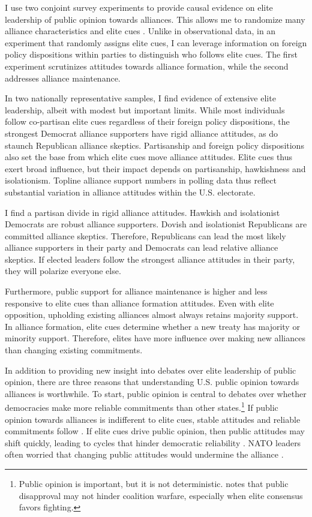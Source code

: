 \documentclass[12pt]{article}
\begin{document}
I use two conjoint survey experiments to provide causal evidence on elite leadership of public opinion towards alliances.
This allows me to randomize many alliance characteristics and elite cues \citep{Hainmuelleretal2014}.
Unlike in observational data, in an experiment that randomly assigns elite cues, I can leverage information on foreign policy dispositions within parties to distinguish who follows elite cues. 
The first experiment scrutinizes attitudes towards alliance formation, while the second addresses alliance maintenance. 


In two nationally representative samples, I find evidence of extensive elite leadership, albeit with modest but important limits.
While most individuals follow co-partisan elite cues regardless of their foreign policy dispositions, the strongest Democrat alliance supporters have rigid alliance attitudes, as do staunch Republican alliance skeptics. 
Partisanship and foreign policy dispositions also set the base from which elite cues move alliance attitudes.
Elite cues thus exert broad influence, but their impact depends on partisanship, hawkishness and isolationism.
Topline alliance support numbers in polling data thus reflect substantial variation in alliance attitudes within the U.S. electorate.


I find a partisan divide in rigid alliance attitudes.
Hawkish and isolationist Democrats are robust alliance supporters.
Dovish and isolationist Republicans are committed alliance skeptics. 
Therefore, Republicans can lead the most likely alliance supporters in their party and Democrats can lead relative alliance skeptics. 
If elected leaders follow the strongest alliance attitudes in their party, they will polarize everyone else. 


Furthermore, public support for alliance maintenance is higher and less responsive to elite cues than alliance formation attitudes.
Even with elite opposition, upholding existing alliances almost always retains majority support. 
In alliance formation, elite cues determine whether a new treaty has majority or minority support. 
Therefore, elites have more influence over making new alliances than changing existing commitments. 


In addition to providing new insight into debates over elite leadership of public opinion, there are three reasons that understanding U.S. public opinion towards alliances is worthwhile. 
To start, public opinion is central to debates over whether democracies make more reliable commitments than other states.\footnote{Public opinion is important, but it is not deterministic. \citet{Kreps2010} notes that public disapproval may not hinder coalition warfare, especially when elite consensus favors fighting.} 
If public opinion towards alliances is indifferent to elite cues, stable attitudes and reliable commitments follow \citep{Gaubatz1996}.
If elite cues drive public opinion, then public attitudes may shift quickly, leading to cycles that hinder democratic reliability \citep{GartzkeGleditsch2004}.
NATO leaders often worried that changing public attitudes would undermine the alliance \citep{Sayle2019}.  
\end{document}
